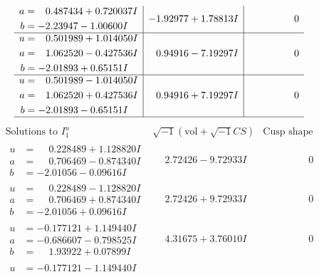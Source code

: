 \documentclass[1p]{elsarticle_modified}
\theoremstyle{definition}
\newcommand{\I}{\sqrt{-1}}
\begin{document}
$$\begin{array}{c|c|c}
\begin{aligned}
a &= \phantom{-}0.487434 + 0.720037 I \\
b &= -2.23947 - 1.00600 I\end{aligned}
 & -1.92977 + 1.78813 I & \phantom{-0.000000 } 0 \\ \hline\begin{aligned}
u &= \phantom{-}0.501989 + 1.014050 I \\
a &= \phantom{-}1.062520 - 0.427536 I \\
b &= -2.01893 + 0.65151 I\end{aligned}
 & \phantom{-}0.94916 - 7.19297 I & \phantom{-0.000000 } 0 \\ \hline\begin{aligned}
u &= \phantom{-}0.501989 - 1.014050 I \\
a &= \phantom{-}1.062520 + 0.427536 I \\
b &= -2.01893 - 0.65151 I\end{aligned}
 & \phantom{-}0.94916 + 7.19297 I & \phantom{-0.000000 } 0\\
 \hline 
 \end{array}$$\newpage$$\begin{array}{c|c|c}  
\text{Solutions to }I^u_{1}& \I (\text{vol} + \sqrt{-1}CS) & \text{Cusp shape}\\
 \hline 
\begin{aligned}
u &= \phantom{-}0.228489 + 1.128820 I \\
a &= \phantom{-}0.706469 - 0.874340 I \\
b &= -2.01056 - 0.09616 I\end{aligned}
 & \phantom{-}2.72426 - 9.72933 I & \phantom{-0.000000 } 0 \\ \hline\begin{aligned}
u &= \phantom{-}0.228489 - 1.128820 I \\
a &= \phantom{-}0.706469 + 0.874340 I \\
b &= -2.01056 + 0.09616 I\end{aligned}
 & \phantom{-}2.72426 + 9.72933 I & \phantom{-0.000000 } 0 \\ \hline\begin{aligned}
u &= -0.177121 + 1.149440 I \\
a &= -0.686607 - 0.798525 I \\
b &= \phantom{-}1.93922 + 0.07899 I\end{aligned}
 & \phantom{-}4.31675 + 3.76010 I & \phantom{-0.000000 } 0 \\ \hline\begin{aligned}
u &= -0.177121 - 1.149440 I \\

\end{aligned}
\end{array}$$
\end{document}
